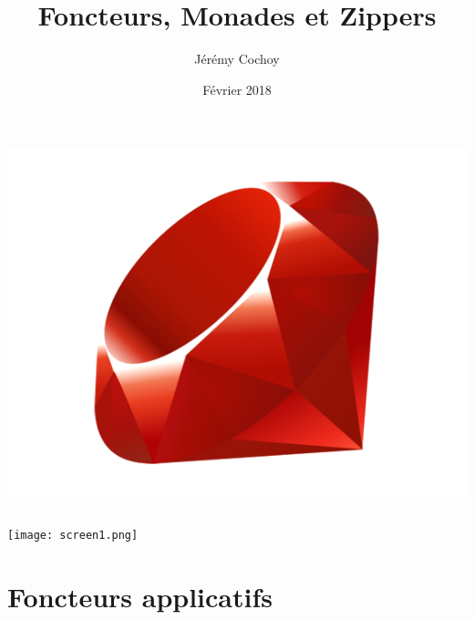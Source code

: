 \documentclass{beamer}
\begin{document}
\title{Foncteurs, Monades et Zippers}
\author{Jérémy Cochoy}
\date{Février 2018}


\begin{frame}
\maketitle
\begin{center}
\includegraphics[scale=0.2]{ruby}
\end{center}
\end{frame}

\begin{frame}
  \begin{columns}[t]
  \begin{column}{5cm}
  \tableofcontents[sections={1-3}]
  \end{column}
  \begin{column}{5cm}
  \tableofcontents[sections={4-8}]
  \end{column}
  \end{columns}
\end{frame}

\begin{frame}

\begin{center}
\texttt{[image: screen1.png]}
\end{center}

\end{frame}

\section{Foncteurs applicatifs}
\end{document}
